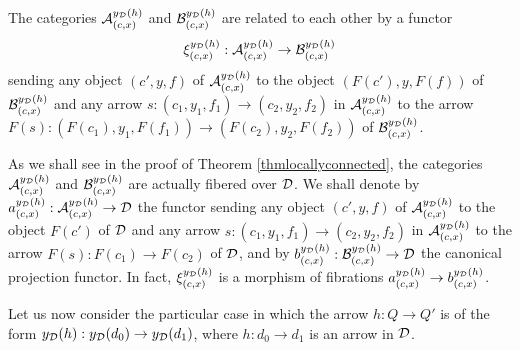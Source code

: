 \documentclass[a4paper,12pt]{article}
\begin{document}
The categories ${\cal A}^{y_{\cal D}(h)}_{(c, x)}$ and ${\cal B}^{y_{\cal D}(h)}_{(c, x)}$ are related to each other by a functor $$\xi^{y_{\cal D}(h)}_{(c, x)}:{\cal A}^{y_{\cal D}(h)}_{(c, x)} \to {\cal B}^{y_{\cal D}(h)}_{(c, x)}$$ sending any object $(c', y, f)$ of ${\cal A}^{y_{\cal D}(h)}_{(c, x)}$ to the object $(F(c'), y, F(f))$ of ${\cal B}^{y_{\cal D}(h)}_{(c, x)}$ and any arrow $s:(c_{1}, y_{1}, f_{1})\to (c_{2}, y_{2}, f_{2})$ in ${\cal A}^{y_{\cal D}(h)}_{(c, x)}$ to the arrow $F(s):(F(c_{1}), y_{1}, F(f_{1}))\to (F(c_{2}), y_{2}, F(f_{2}))$ of ${\cal B}^{y_{\cal D}(h)}_{(c, x)}$. 

As we shall see in the proof of Theorem \ref{thmlocallyconnected}, the categories ${\cal A}^{y_{\cal D}(h)}_{(c, x)}$ and ${\cal B}^{y_{\cal D}(h)}_{(c, x)}$ are actually fibered over $\cal D$.
We shall denote by $a^{y_{\cal D}(h)}_{(c, x)}:{\cal A}^{y_{\cal D}(h)}_{(c, x)} \to {\cal D}$ the functor sending any object  $(c', y, f)$ of ${\cal A}^{y_{\cal D}(h)}_{(c, x)}$ to the object $F(c')$ of $\cal D$ and any arrow $s:(c_{1}, y_{1}, f_{1})\to (c_{2}, y_{2}, f_{2})$ in ${\cal A}^{y_{\cal D}(h)}_{(c, x)}$ to the arrow $F(s):F(c_1)\to F(c_2)$ of $\cal D$, and by $b^{y_{\cal D}(h)}_{(c, x)}:{\cal B}^{y_{\cal D}(h)}_{(c, x)} \to {\cal D}$ the canonical projection functor. In fact, $\xi^{y_{\cal D}(h)}_{(c, x)}$ is a morphism of fibrations $a^{y_{\cal D}(h)}_{(c, x)} \to b^{y_{\cal D}(h)}_{(c, x)}$.  

Let us now consider the particular case in which the arrow $h:Q\to Q'$ is of the form $y_{\cal D}(h):y_{\cal D}(d_{0})\to y_{\cal D}(d_{1})$, where $h:d_{0}\to d_{1}$ is an arrow in $\cal D$.  
\end{document}
